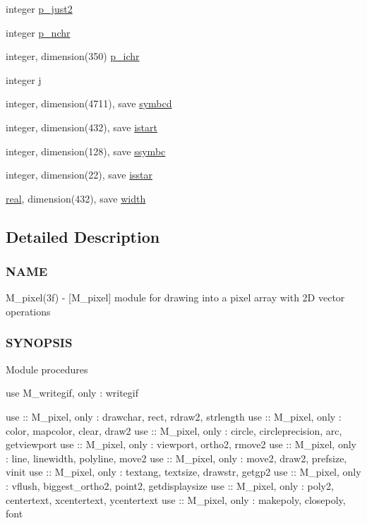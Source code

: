 \begin{DoxyCompactItemize}
\item 
integer \hyperlink{namespacem__pixel_a9d00991f1ff7ed891170100d8e9d64f0}{p\+\_\+just2}
\item 
integer \hyperlink{namespacem__pixel_a70edd7b43b9667a9d304b3028f113cc8}{p\+\_\+nchr}
\item 
integer, dimension(350) \hyperlink{namespacem__pixel_a34ef1aad7a3aa45df090b226788a2d2c}{p\+\_\+ichr}
\item 
integer \hyperlink{namespacem__pixel_a1faa00d5ad36016f8c9f4522a2391209}{j}
\item 
integer, dimension(4711), save \hyperlink{namespacem__pixel_a3da3613bd8dfa6a15b7d0aa3db1f9eb5}{symbcd}
\item 
integer, dimension(432), save \hyperlink{namespacem__pixel_af41ef8a6b53ec63db42172fab83ecbfa}{istart}
\item 
integer, dimension(128), save \hyperlink{namespacem__pixel_a2b75d036a498ac0c68380803a0f1d538}{ssymbc}
\item 
integer, dimension(22), save \hyperlink{namespacem__pixel_a6f8d92e6b4c33e62399d3286448b76fa}{isstar}
\item 
\hyperlink{read__watch_83_8txt_abdb62bde002f38ef75f810d3a905a823}{real}, dimension(432), save \hyperlink{namespacem__pixel_abf266872f93a04af39d2903fb20d2a0d}{width}
\end{DoxyCompactItemize}


\subsection{Detailed Description}
\subsubsection*{N\+A\+ME}

M\+\_\+pixel(3f) -\/ \mbox{[}M\+\_\+pixel\mbox{]} module for drawing into a pixel array with 2D vector operations 

\subsubsection*{S\+Y\+N\+O\+P\+S\+IS}

Module procedures

use M\+\_\+writegif, only \+: writegif

use \+:\+: M\+\_\+pixel, only \+: drawchar, rect, rdraw2, strlength use \+:\+: M\+\_\+pixel, only \+: color, mapcolor, clear, draw2 use \+:\+: M\+\_\+pixel, only \+: circle, circleprecision, arc, getviewport use \+:\+: M\+\_\+pixel, only \+: viewport, ortho2, rmove2 use \+:\+: M\+\_\+pixel, only \+: line, linewidth, polyline, move2 use \+:\+: M\+\_\+pixel, only \+: move2, draw2, prefsize, vinit use \+:\+: M\+\_\+pixel, only \+: textang, textsize, drawstr, getgp2 use \+:\+: M\+\_\+pixel, only \+: vflush, biggest\+\_\+ortho2, point2, getdisplaysize use \+:\+: M\+\_\+pixel, only \+: poly2, centertext, xcentertext, ycentertext use \+:\+: M\+\_\+pixel, only \+: makepoly, closepoly, font

